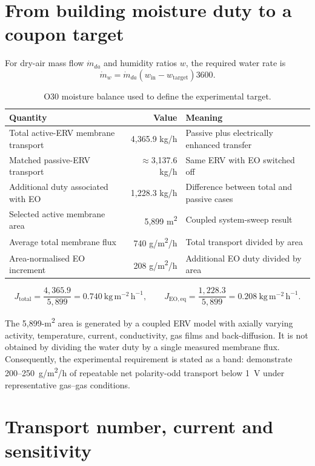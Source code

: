 \documentclass[10pt,a4paper]{article}
\begin{document}
\clearpage
\tableofcontents
\clearpage

\section{From building moisture duty to a coupon target}

For dry-air mass flow $\dot m_{da}$ and humidity ratios $w$, the required water
rate is
\[
\dot m_w=\dot m_{da}(w_{\mathrm{in}}-w_{\mathrm{target}})3600.
\]

\begin{table}[htbp]
\centering
\caption{O30 moisture balance used to define the experimental target.}
\begin{tabularx}{\textwidth}{@{}Y R Y@{}}
\toprule
Quantity & Value & Meaning \\
\midrule
Total active-ERV membrane transport & 4,365.9 kg/h & Passive plus electrically enhanced transfer \\
Matched passive-ERV transport & $\approx$3,137.6 kg/h & Same ERV with EO switched off \\
Additional duty associated with EO & 1,228.3 kg/h & Difference between total and passive cases \\
Selected active membrane area & 5,899 m\textsuperscript{2} & Coupled system-sweep result \\
Average total membrane flux & 740 g/m\textsuperscript{2}/h & Total transport divided by area \\
Area-normalised EO increment & 208 g/m\textsuperscript{2}/h & Additional EO duty divided by area \\
\bottomrule
\end{tabularx}
\end{table}

\[
J_{\mathrm{total}}=\frac{4{,}365.9}{5{,}899}
=0.740~\mathrm{kg\,m^{-2}\,h^{-1}},
\qquad
J_{\mathrm{EO,eq}}=\frac{1{,}228.3}{5{,}899}
=0.208~\mathrm{kg\,m^{-2}\,h^{-1}}.
\]

The 5,899-m\textsuperscript{2} area is generated by a coupled ERV model with
axially varying activity, temperature, current, conductivity, gas films and
back-diffusion. It is not obtained by dividing the water duty by a single
measured membrane flux. Consequently, the experimental requirement is stated
as a band: demonstrate 200--250~g/m\textsuperscript{2}/h of repeatable net
polarity-odd transport below 1~V under representative gas--gas conditions.

\section{Transport number, current and sensitivity}
\end{document}
